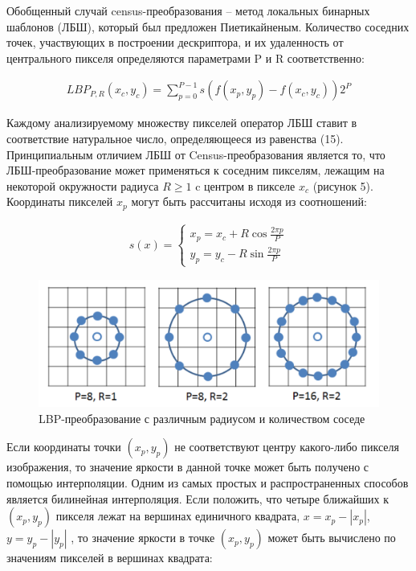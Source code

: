 \documentclass[a4paper, 14pt]{extarticle}	%
\begin{document}
Обобщенный случай census-преобразования -- метод локальных бинарных шаблонов (ЛБШ), который был предложен Пиетикайненым. Количество соседних  точек,  участвующих  в  построении  дескриптора,  и  их  удаленность  от центрального пикселя определяются параметрами P и R соответственно:

\begin{gather}
LBP_{P,R}(x_c, y_c) =  \sum\limits_{p=0}^{P-1}s(f(x_p, y_p)-f(x_c, y_c))2^P
\end{gather}

Каждому  анализируемому  множеству  пикселей  оператор ЛБШ ставит  в соответствие   натуральное   число,   определяющееся   из   равенства (15). Принципиальным отличием ЛБШ от Census-преобразования является то, что ЛБШ-преобразование может применяться к соседним пикселям, лежащим на некоторой окружности  радиуса $R \ge 1$ c центром  в  пикселе $x_c$ (рисунок 5).  Координаты пикселей $x_p$ могут быть рассчитаны исходя из соотношений:

\begin{gather}
s(x) =
  \begin{cases}
    x_p=x_c + R \cos \frac{2 \pi p}{P} \\
    y_p=y_c - R \sin \frac{2 \pi p}{P}
 \end{cases}
\end{gather}

\begin{figure}[h!]
\centering
\includegraphics[scale=0.33]{res/pic005}
\caption{LBP-преобразование с различным радиусом и количеством соседе}
\end{figure}

Если  координаты  точки $(x_p, y_p)$ не  соответствуют  центру  какого-либо пикселя изображения, то значение яркости в данной точке может быть получено с помощью интерполяции. Одним из самых простых и распространенных способов является  билинейная  интерполяция.  Если  положить,  что  четыре  ближайших  к $(x_p, y_p)$ пикселя лежат на вершинах единичного квадрата, $x = x_p - | x_p |$, $y = y_p - | y_p |$ , то значение яркости в точке $(x_p, y_p)$ может быть вычислено по значениям пикселей в вершинах квадрата:
\end{document}
